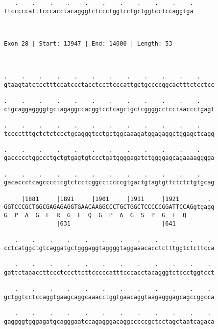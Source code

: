 \documentclass{article}
\begin{document}
\begin{Verbatim}
   .    .    .    .    .    .    .    .    .    .    .
ttcccccatttcccacctacagggtctccctggtcctgctggtcctccaggtga
                                                      
                                                      
 
Exon 28 | Start: 13947 | End: 14000 | Length: 53



.    .    .    .    .    .    .    .    .    .    .    .    
gtaagtatctcctttccatccctacctccttcccattgctgccccggcactttctcctcc
                                                            
.    .    .    .    .    .    .    .    .    .    .    .    
ctgcaggaggggtgctagaggccacggtcctcagctgctcggggcctcctaaccctgagt
                                                            
.    .    .    .    .    .    .    .    .    .    .    .    
tcccctttgctctctccctgcagggtcctgctggcaaagatggagaggctggagctcagg
                                                            
.    .    .    .    .    .    .    .    .    .    .    .    
gaccccctggccctgctgtgagtgtccctgatggggagatctggggagcagaaaagggga
                                                            
.    .    .    .    .    .    .    .    .    .    .    .    
gacaccctcagcccctcgtctcctcggcctccccgtgactgtagtgttctctctgtgcag
                                                            
     |1881     |1891     |1901     |1911     |1921        . 
GGTCCCGCTGGCGAGAGAGGTGAACAAGGCCCTGCTGGCTCCCCCGGATTCCAGgtgagg
G  P  A  G  E  R  G  E  Q  G  P  A  G  S  P  G  F  Q        
               |631                          |641           
  
   .    .    .    .    .    .    .    .    .    .    .    . 
cctcatggctgtcaggatgctgggaggtaggggtaggaaacacctctttggtctcttcca
                                                            
   .    .    .    .    .    .    .    .    .    .    .    . 
gattctaaaccttccctcccttcttcccccatttcccacctacagggtctccctggtcct
                                                            
   .    .    .    .    .    .    .    .    .    .    .    . 
gctggtcctccaggtgaagcaggcaaacctggtgaacaggtaagagggagcagccggcca
                                                            
   .    .    .    .    .    .    .    .    .    .    .    . 
gaggggtgggagatgcagggaatccagagggacaggcccccgctcctagctaatcagaca
                                                            

\end{Verbatim}
\end{document}
